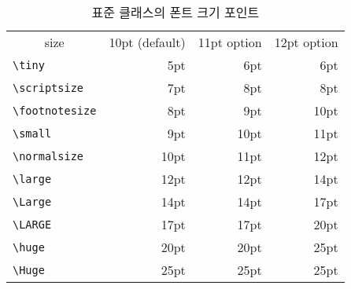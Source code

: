 
\begin{table}[!tbp]
\caption{표준 클래스의 폰트 크기 포인트}\label{tab:pointsizes}
\label{tab:sizes}
\begin{lined}{12cm}
\begin{tabular}{lrrr}
\multicolumn{1}{c}{size} &
\multicolumn{1}{c}{10pt (default) } &
           \multicolumn{1}{c}{11pt option}  &
           \multicolumn{1}{c}{12pt option}\\
\verb|\tiny|       & 5pt  & 6pt & 6pt\\
\verb|\scriptsize| & 7pt  & 8pt & 8pt\\
\verb|\footnotesize| & 8pt & 9pt & 10pt \\
\verb|\small|        & 9pt & 10pt & 11pt \\
\verb|\normalsize| & 10pt & 11pt & 12pt \\
\verb|\large|      & 12pt & 12pt & 14pt \\
\verb|\Large|      & 14pt & 14pt & 17pt \\
\verb|\LARGE|      & 17pt & 17pt & 20pt\\
\verb|\huge|       & 20pt & 20pt & 25pt\\
\verb|\Huge|       & 25pt & 25pt & 25pt\\
\end{tabular}

\bigskip
\end{lined}
\end{table}


